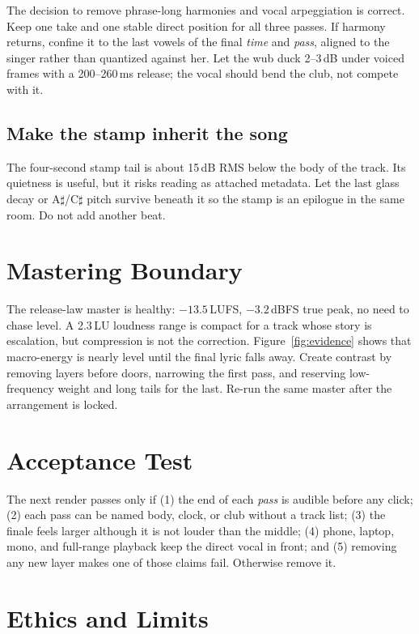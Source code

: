 \documentclass[10pt,letterpaper,twocolumn]{article}
\newcommand{\dbfs}{\,dBFS}
\newcommand{\lufs}{\,LUFS}
\begin{document}
The decision to remove phrase-long harmonies and vocal arpeggiation is correct. Keep one take and one stable direct position for all three passes. If harmony returns, confine it to the last vowels of the final \textit{time} and \textit{pass}, aligned to the singer rather than quantized against her. Let the wub duck 2--3\,dB under voiced frames with a 200--260\,ms release; the vocal should bend the club, not compete with it.

\subsection{Make the stamp inherit the song}

The four-second stamp tail is about 15\,dB RMS below the body of the track. Its quietness is useful, but it risks reading as attached metadata. Let the last glass decay or A\(\sharp\)/C\(\sharp\) pitch survive beneath it so the stamp is an epilogue in the same room. Do not add another beat.

\section{Mastering Boundary}

The release-law master is healthy: $-13.5$\lufs{}, $-3.2$\dbfs{} true peak, no need to chase level. A 2.3\,LU loudness range is compact for a track whose story is escalation, but compression is not the correction. Figure~\ref{fig:evidence} shows that macro-energy is nearly level until the final lyric falls away. Create contrast by removing layers before doors, narrowing the first pass, and reserving low-frequency weight and long tails for the last. Re-run the same master after the arrangement is locked.

\section{Acceptance Test}

The next render passes only if (1) the end of each \textit{pass} is audible before any click; (2) each pass can be named body, clock, or club without a track list; (3) the finale feels larger although it is not louder than the middle; (4) phone, laptop, mono, and full-range playback keep the direct vocal in front; and (5) removing any new layer makes one of those claims fail. Otherwise remove it.

\section{Ethics and Limits}
\end{document}
